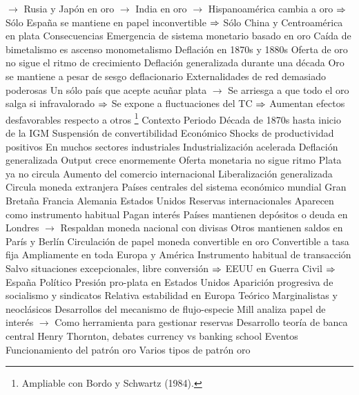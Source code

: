 \documentclass{nuevotema}
\begin{document}
\begin{esquemal}
				\4[] $\to$ Rusia y Japón en oro
				\4[] $\to$ India en oro
				\4[] $\to$ Hispanoamérica cambia a oro
				\4[] $\Rightarrow$ Sólo España se mantiene en papel inconvertible
				\4[] $\Rightarrow$ Sólo China y Centroamérica en plata
		\2 Consecuencias
			\3 Emergencia de sistema monetario basado en oro
				\4 Caída de bimetalismo es ascenso monometalismo
			\3 Deflación en 1870s y 1880s
				\4 Oferta de oro no sigue el ritmo de crecimiento
				\4 Deflación generalizada durante una década
				\4 Oro se mantiene a pesar de sesgo deflacionario
				\4[] Externalidades de red demasiado poderosas
				\4[] Un sólo país que acepte acuñar plata
				\4[] $\to$ Se arriesga a que todo el oro salga si infravalorado
				\4[] $\Rightarrow$ Se expone a fluctuaciones del TC
				\4[] $\Rightarrow$ Aumentan efectos desfavorables respecto a otros
	\1 \footnote{Ampliable con Bordo y Schwartz (1984).}
		\2 Contexto
			\3 Periodo
				\4 Década de 1870s hasta inicio de la IGM
				\4[] Suspensión de convertibilidad
			\3 Económico
				\4 Shocks de productividad positivos
				\4[] En muchos sectores industriales
				\4[] Industrialización acelerada
				\4 Deflación generalizada
				\4[] Output crece enormemente
				\4[] Oferta monetaria no sigue ritmo
				\4[] Plata ya no circula
				\4 Aumento del comercio internacional
				\4[] Liberalización generalizada
				\4[] Circula moneda extranjera
				\4 Países centrales del sistema económico mundial
				\4[] Gran Bretaña
				\4[] Francia
				\4[] Alemania
				\4[] Estados Unidos
				\4 Reservas internacionales
				\4[] Aparecen como instrumento habitual
				\4[] Pagan interés
				\4[] Países mantienen depósitos o deuda en Londres
				\4[] $\to$ Respaldan moneda nacional con divisas
				\4[] Otros mantienen saldos en París y Berlín
				\4 Circulación de papel moneda convertible en oro
				\4[] Convertible a tasa fija
				\4[] Ampliamente en toda Europa y América
				\4[] Instrumento habitual de transacción
				\4[] Salvo situaciones excepcionales, libre conversión
				\4[] $\Rightarrow$ EEUU en Guerra Civil
				\4[] $\Rightarrow$ España
			\3 Político
				\4 Presión pro-plata en Estados Unidos
				\4 Aparición progresiva de socialismo y sindicatos
				\4 Relativa estabilidad en Europa
			\3 Teórico
				\4 Marginalistas y neoclásicos
				\4 Desarrollos del mecanismo de flujo-especie
				\4[] Mill analiza papel de interés
				\4[] $\to$ Como herramienta para gestionar reservas
				\4 Desarrollo teoría de banca central
				\4[] Henry Thornton, debates currency vs banking school
		\2 Eventos
			\3 Funcionamiento del patrón oro
				\4 Varios tipos de patrón oro

\end{esquemal}
\end{document}
